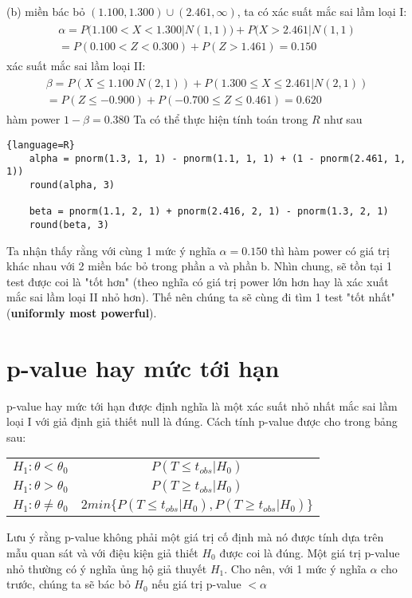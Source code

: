 (b) miền bác bỏ $(1.100, 1.300) \cup (2.461, \infty)$, ta có xác suất mắc sai lầm loại I: 
\begin{align*}
	\begin{split}
		\alpha = P(1.100 < X < 1.300 | N(1, 1)) + P(X > 2.461 | N(1, 1) \\
		= P(0.100 < Z < 0.300) + P(Z > 1.461) = 0.150
	\end{split}	
\end{align*}
xác suất mắc sai lầm loại II:
\begin{align*}
	\begin{split}
		\beta = P(X \leqslant 1.100 \ N(2, 1)) + P(1.300 \leqslant X \leqslant 2.461 | N(2, 1)) \\
		= P(Z \leqslant -0.900) + P(-0.700 \leqslant Z \leqslant 0.461) = 0.620
	\end{split}
\end{align*}
hàm power $1 - \beta = 0.380$
Ta có thể thực hiện tính toán trong $R$ như sau 
\begin{lstlisting}{language=R}
	alpha = pnorm(1.3, 1, 1) - pnorm(1.1, 1, 1) + (1 - pnorm(2.461, 1, 1))
	round(alpha, 3)

	beta = pnorm(1.1, 2, 1) + pnorm(2.416, 2, 1) - pnorm(1.3, 2, 1)
	round(beta, 3)
\end{lstlisting}
Ta nhận thấy rằng với cùng 1 mức ý nghĩa $\alpha = 0.150$ thì hàm power có giá trị khác nhau 
với 2 miền bác bỏ trong phần a và phần b. Nhìn chung, sẽ tồn tại 1 test được coi là "tốt hơn"
(theo nghĩa có giá trị power lớn hơn hay là xác xuất mắc sai lầm loại II nhỏ hơn).
Thế nên chúng ta sẽ cùng đi tìm 1 test "tốt nhất" (\textbf{uniformly most powerful}).

\section{p-value hay mức tới hạn}
p-value hay mức tới hạn được định nghĩa là một xác suất nhỏ nhất mắc sai lầm loại I với 
giả định giả thiết null là đúng.
Cách tính p-value được cho trong bảng sau:
\begin{center}
    \begin{tabular}{| c | c |}
        \hline
        $H_1: \theta < \theta_0$ & $P(T \leqslant t_{obs} | H_0)$ \\
		$H_1: \theta > \theta_0$ & $P(T \geqslant t_{obs} | H_0)$ \\
		$H_1: \theta \neq \theta_0$ & $2min\{P(T \leqslant t_{obs} | H_0), P(T \geqslant t_{obs} | H_0)\}$ \\
        \hline
    \end{tabular}
\end{center}
Lưu ý rằng p-value không phải một giá trị cố định mà nó được tính dựa trên mẫu quan sát và
với điệu kiện giả thiết $H_0$ được coi là đúng.
Một giá trị p-value nhỏ thường có ý nghĩa ủng hộ giả thuyết $H_1$. Cho nên, với 1 mức ý nghĩa
$\alpha$ cho trước, chúng ta sẽ bác bỏ $H_0$ nếu giá trị p-value $< \alpha$

